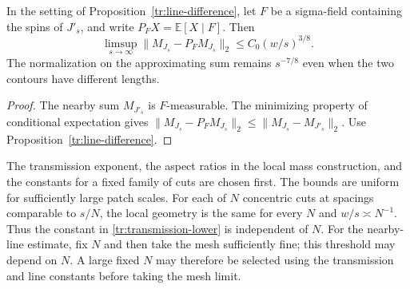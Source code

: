 \begin{corollary}
\label{tr:line-regularity}
In the setting of Proposition~\ref{tr:line-difference}, let $F$ be a
sigma-field containing the spins of $J'_s$, and write
$P_FX=\mathbb E[X\mid F]$. Then
\begin{equation}
\label{tr:line-regularity-eq}
 \limsup_{s\to\infty}\|M_{J_s}-P_FM_{J_s}\|_2
 \leq C_0(w/s)^{3/8}.
\end{equation}
The normalization on the approximating sum remains $s^{-7/8}$ even
when the two contours have different lengths.
\end{corollary}

\begin{proof}
The nearby sum $M_{J'_s}$ is $F$-measurable. The minimizing property of
conditional expectation gives
$\|M_{J_s}-P_FM_{J_s}\|_2\leq\|M_{J_s}-M_{J'_s}\|_2$.
Use Proposition~\ref{tr:line-difference}.
\end{proof}


\begin{remark}\label{tr:quantifiers}
The transmission exponent, the aspect ratios in the local mass construction,
and the constants for a fixed family of cuts are chosen first. The bounds
are uniform for sufficiently large patch scales. For each of $N$ concentric cuts
at spacings comparable to $s/N$, the local geometry is the same for every
$N$ and $w/s\asymp N^{-1}$. Thus the constant in
\eqref{tr:transmission-lower} is independent of $N$. For the nearby-line
estimate, fix $N$ and then take the mesh sufficiently fine; this threshold
may depend on $N$. A large fixed $N$ may therefore be selected using the
transmission and line constants before taking the mesh limit.
\end{remark}
